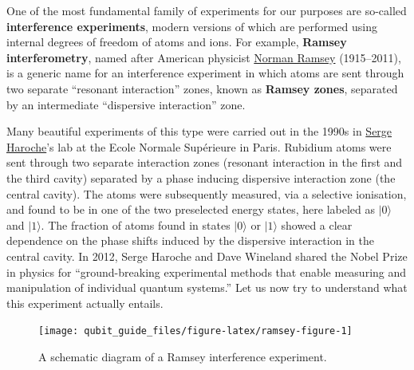 \documentclass[fleqn,a4paper]{article}
\theoremstyle{definition}
\theoremstyle{definition}
\theoremstyle{definition}
\theoremstyle{definition}
\theoremstyle{remark}
\begin{document}
One of the most fundamental family of experiments for our purposes are so-called \textbf{interference experiments}, modern versions of which are performed using internal degrees of freedom of atoms and ions.
For example, \textbf{Ramsey interferometry}, named after American physicist \href{https://en.wikipedia.org/wiki/Norman_Foster_Ramsey_Jr.}{Norman Ramsey} (1915--2011), is a generic name for an interference experiment in which atoms are sent through two separate ``resonant interaction'' zones, known as \textbf{Ramsey zones}, separated by an intermediate ``dispersive interaction'' zone.

Many beautiful experiments of this type were carried out in the 1990s in \href{https://en.wikipedia.org/wiki/Serge_Haroche}{Serge Haroche}'s lab at the Ecole Normale Supérieure in Paris.
Rubidium atoms were sent through two separate interaction zones (resonant interaction in the first and the third cavity) separated by a phase inducing dispersive interaction zone (the central cavity).
The atoms were subsequently measured, via a selective ionisation, and found to be in one of the two preselected energy states, here labeled as \(|0\rangle\) and \(|1\rangle\).
The fraction of atoms found in states \(|0\rangle\) or \(|1\rangle\) showed a clear dependence on the phase shifts induced by the dispersive interaction in the central cavity.
In 2012, Serge Haroche and Dave Wineland shared the Nobel Prize in physics for ``ground-breaking experimental methods that enable measuring and manipulation of individual quantum systems.''
Let us now try to understand what this experiment actually entails.



\begin{figure}[H]

{\centering \texttt{[image: qubit\_guide\_files/figure-latex/ramsey-figure-1]} 

}

\caption{A schematic diagram of a Ramsey interference experiment.}\label{fig:ramsey-figure}
\end{figure}
\end{document}
